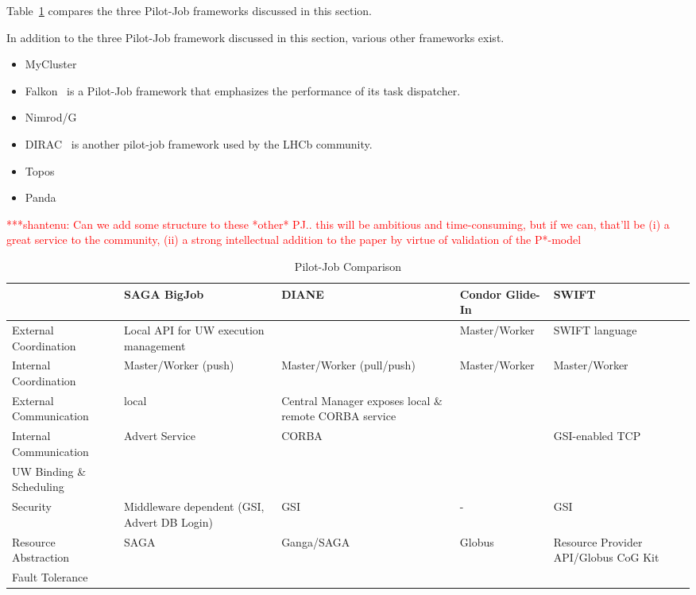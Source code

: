 \documentclass[conference,final]{IEEEtran}
\newcommand{\jhanote}[1]{ {\textcolor{red} { ***shantenu: #1 }}}
\newcommand{\jhanote}[1]{}
\begin{document}
Table~\ref{table:pilot-job-comparison} compares the three Pilot-Job frameworks 
discussed in this section.

In addition to the three Pilot-Job framework discussed in this section, various
other frameworks exist.
\begin{itemize}
    \item MyCluster
    \item Falkon~\cite{1362680} is a Pilot-Job framework that emphasizes the 
	performance of its task dispatcher.
    \item Nimrod/G
    \item DIRAC~\cite{1742-6596-219-6-062049} is another pilot-job framework 
	used by the LHCb community.
    \item Topos
    \item Panda    
\end{itemize}



\jhanote{Can we add some structure to these *other* PJ.. this will be
  ambitious and time-consuming, but if we can, that'll be (i) a great
  service to the community, (ii) a strong intellectual addition to the
  paper by virtue of validation of the P*-model}


\begin{table}[t]
\centering
\begin{tabular}{|l|p{2.5cm}|p{2.5cm}|p{2.5cm}|p{2.5cm}|}
	\hline
	&\textbf{SAGA BigJob} &\textbf{DIANE} &\textbf{Condor Glide-In} &   
	\textbf{SWIFT} \\ \hline
External Coordination &Local API for UW execution management & &Master/Worker &SWIFT language\\ \hline

Internal Coordination &Master/Worker (push) &Master/Worker (pull/push) &Master/Worker &Master/Worker \\ \hline

External Communication &local &Central Manager exposes local \& remote CORBA service & &\\ \hline
	
Internal Communication &Advert Service &CORBA & &GSI-enabled TCP \\ \hline

UW Binding \& Scheduling &&&&\\ \hline

Security &Middleware dependent (GSI, Advert DB Login) &GSI &- &GSI\\ \hline

Resource Abstraction &SAGA &Ganga/SAGA &Globus &Resource Provider API/Globus CoG 
Kit \\ \hline

Fault Tolerance  &&&&\\ \hline
	
\end{tabular}
\caption{Pilot-Job Comparison}\label{table:pilot-job-comparison}
\end{table}
\end{document}
